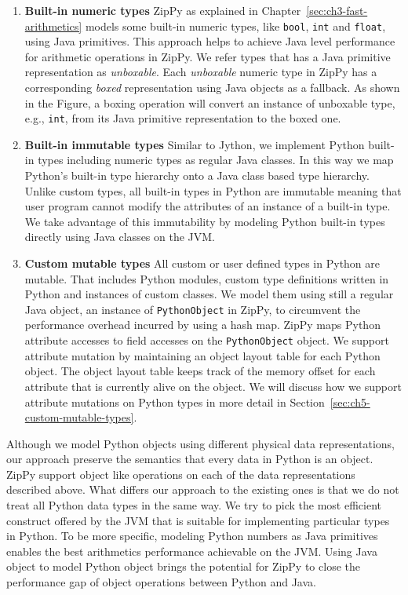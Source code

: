 \begin{enumerate}

\item \textbf{Built-in numeric types}
ZipPy as explained in Chapter~\ref{sec:ch3-fast-arithmetics} models some built-in numeric types, like \texttt{bool}, \texttt{int} and \texttt{float}, using Java primitives.
This approach helps to achieve Java level performance for arithmetic operations in ZipPy.
We refer types that has a Java primitive representation as \emph{unboxable}.
Each \emph{unboxable} numeric type in ZipPy has a corresponding \emph{boxed} representation using Java objects as a fallback.
As shown in the Figure, a boxing operation will convert an instance of unboxable type, e.g., \texttt{int}, from its Java primitive representation to the boxed one.

\item \textbf{Built-in immutable types}
Similar to Jython, we implement Python built-in types including numeric types as regular Java classes.
In this way we map Python's built-in type hierarchy onto a Java class based type hierarchy.
Unlike custom types, all built-in types in Python are immutable meaning that user program cannot modify the attributes of an instance of a built-in type.
We take advantage of this immutability by modeling Python built-in types directly using Java classes on the JVM.

\item \textbf{Custom mutable types}
All custom or user defined types in Python are mutable.
That includes Python modules, custom type definitions written in Python and instances of custom classes.
We model them using still a regular Java object, an instance of \texttt{PythonObject} in ZipPy, to circumvent the performance overhead incurred by using a hash map.
ZipPy maps Python attribute accesses to field accesses on the \texttt{PythonObject} object.
We support attribute mutation by maintaining an object layout table for each Python object.
The object layout table keeps track of the memory offset for each attribute that is currently alive on the object.
We will discuss how we support attribute mutations on Python types in more detail in Section~\ref{sec:ch5-custom-mutable-types}.

\end{enumerate}

Although we model Python objects using different physical data representations, our approach preserve the semantics that every data in Python is an object.
ZipPy support object like operations on each of the data representations described above.
What differs our approach to the existing ones is that we do not treat all Python data types in the same way.
We try to pick the most efficient construct offered by the JVM that is suitable for implementing particular types in Python.
To be more specific, modeling Python numbers as Java primitives enables the best arithmetics performance achievable on the JVM.
Using Java object to model Python object brings the potential for ZipPy to close the performance gap of object operations between Python and Java.

